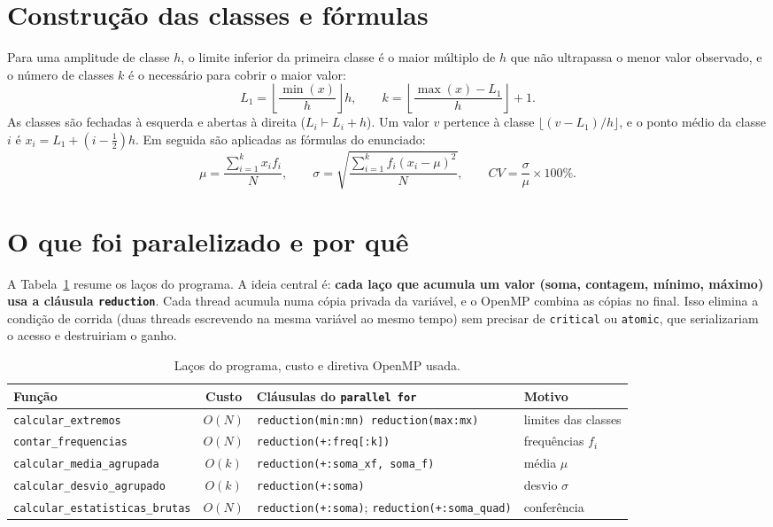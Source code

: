 \documentclass[11pt,a4paper]{article}
\begin{document}
\section{Construção das classes e fórmulas}

Para uma amplitude de classe $h$, o limite inferior da primeira classe é o maior múltiplo de $h$
que não ultrapassa o menor valor observado, e o número de classes $k$ é o necessário para cobrir o maior valor:
\[
  L_1 = \left\lfloor \frac{\min(x)}{h} \right\rfloor h, \qquad
  k = \left\lfloor \frac{\max(x) - L_1}{h} \right\rfloor + 1 .
\]
As classes são fechadas à esquerda e abertas à direita ($L_i \vdash L_i + h$). Um valor $v$ pertence à classe
$\lfloor (v - L_1)/h \rfloor$, e o ponto médio da classe $i$ é $x_i = L_1 + (i - \tfrac12)h$.
Em seguida são aplicadas as fórmulas do enunciado:
\[
  \mu = \frac{\sum_{i=1}^{k} x_i f_i}{N}, \qquad
  \sigma = \sqrt{\frac{\sum_{i=1}^{k} f_i (x_i - \mu)^2}{N}}, \qquad
  CV = \frac{\sigma}{\mu}\times 100\% .
\]

\section{O que foi paralelizado e por quê}

A Tabela~\ref{tab:lacos} resume os laços do programa. A ideia central é: \textbf{cada laço que acumula um valor
(soma, contagem, mínimo, máximo) usa a cláusula \texttt{reduction}}. Cada thread acumula numa cópia privada da
variável, e o OpenMP combina as cópias no final. Isso elimina a condição de corrida (duas threads
escrevendo na mesma variável ao mesmo tempo) sem precisar de \texttt{critical} ou \texttt{atomic}, que
serializariam o acesso e destruiriam o ganho.

\begin{table}[H]
\centering
\footnotesize
\caption{Laços do programa, custo e diretiva OpenMP usada.}
\label{tab:lacos}
\begin{tabular}{@{}lcll@{}}
\toprule
Função & Custo & Cláusulas do \texttt{parallel for} & Motivo \\
\midrule
\texttt{calcular\_extremos} & $O(N)$ & \texttt{reduction(min:mn) reduction(max:mx)} & limites das classes \\
\texttt{contar\_frequencias} & $O(N)$ & \texttt{reduction(+:freq[:k])} & frequências $f_i$ \\
\texttt{calcular\_media\_agrupada} & $O(k)$ & \texttt{reduction(+:soma\_xf, soma\_f)} & média $\mu$ \\
\texttt{calcular\_desvio\_agrupado} & $O(k)$ & \texttt{reduction(+:soma)} & desvio $\sigma$ \\
\texttt{calcular\_estatisticas\_brutas} & $O(N)$ & \texttt{reduction(+:soma)}; \texttt{reduction(+:soma\_quad)} & conferência \\
\bottomrule
\end{tabular}
\end{table}
\end{document}
